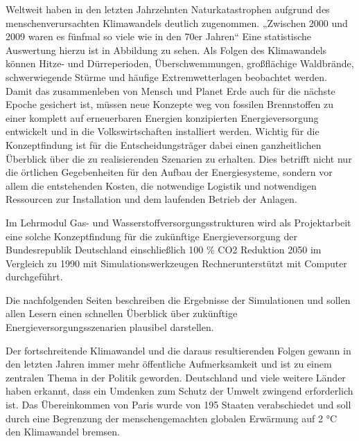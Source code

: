 \newpage
{}
Weltweit haben in den letzten Jahrzehnten Naturkatastrophen aufgrund des menschenverursachten Klimawandels deutlich zugenommen. „Zwischen 2000 und 2009 waren es fünfmal so viele wie in den 70er Jahren“ 
Eine statistische Auswertung hierzu ist in Abbildung  zu sehen. Als Folgen des Klimawandels können Hitze- und Dürreperioden, Überschwemmungen, großflächige Waldbrände, schwerwiegende Stürme und häufige Extremwetterlagen beobachtet werden.
Damit das zusammenleben von Mensch und Planet Erde auch für die nächste Epoche gesichert ist, müssen neue Konzepte weg von fossilen Brennstoffen zu einer komplett auf erneuerbaren Energien konzipierten Energieversorgung entwickelt und in die Volkswirtschaften installiert
werden. Wichtig für die Konzeptfindung ist für die Entscheidungsträger dabei einen ganzheitlichen Überblick über die zu realisierenden Szenarien zu erhalten. Dies betrifft nicht nur die örtlichen Gegebenheiten für den Aufbau der Energiesysteme, sondern vor allem die entstehenden Kosten, die notwendige Logistik und notwendigen Ressourcen zur Installation und dem laufenden Betrieb der Anlagen. 

Im Lehrmodul Gas- und Wasserstoffversorgungsstrukturen wird als Projektarbeit eine solche Konzeptfindung für die zukünftige Energieversorgung der Bundesrepublik Deutschland einschließlich 100 \% CO2 Reduktion 2050 im Vergleich zu 1990 mit Simulationswerkzeugen Rechnerunterstützt mit Computer durchgeführt. 

Die nachfolgenden Seiten beschreiben die Ergebnisse der Simulationen und sollen allen Lesern einen schnellen Überblick über zukünftige Energieversorgungsszenarien plausibel darstellen. 




\newpage
{}
Der fortschreitende Klimawandel und die daraus resultierenden Folgen gewann in den letzten Jahren immer mehr öffentliche Aufmerksamkeit und ist zu einem zentralen Thema in der Politik geworden. Deutschland und viele weitere Länder haben erkannt, dass ein Umdenken zum Schutz der Umwelt zwingend erforderlich ist. Das Übereinkommen von Paris wurde von 195 Staaten verabschiedet und soll durch eine Begrenzung der menschengemachten globalen Erwärmung auf 2 °C den Klimawandel bremsen. 

